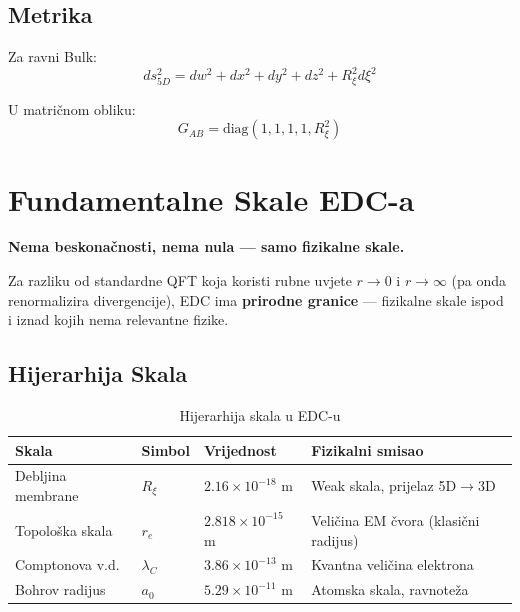 \documentclass[12pt,a4paper]{article}
\begin{document}
\subsection{Metrika}

Za ravni Bulk:
\begin{equation}
ds^2_{5D} = dw^2 + dx^2 + dy^2 + dz^2 + R_\xi^2 d\xi^2
\end{equation}

U matričnom obliku:
\begin{equation}
G_{AB} = \text{diag}(1, 1, 1, 1, R_\xi^2)
\end{equation}

\section{Fundamentalne Skale EDC-a}

\begin{edcprinciple}
\textbf{Nema beskonačnosti, nema nula — samo fizikalne skale.}

Za razliku od standardne QFT koja koristi rubne uvjete $r \to 0$ i $r \to \infty$ (pa onda renormalizira divergencije), EDC ima \textbf{prirodne granice} — fizikalne skale ispod i iznad kojih nema relevantne fizike.
\end{edcprinciple}

\subsection{Hijerarhija Skala}

\begin{table}[H]
\centering
\begin{tabular}{@{}llll@{}}
\toprule
\textbf{Skala} & \textbf{Simbol} & \textbf{Vrijednost} & \textbf{Fizikalni smisao} \\
\midrule
Debljina membrane & $R_\xi$ & $2.16 \times 10^{-18}$ m & Weak skala, prijelaz 5D$\to$3D \\
Topološka skala & $r_e$ & $2.818 \times 10^{-15}$ m & Veličina EM čvora (klasični radijus) \\
Comptonova v.d. & $\lambda_C$ & $3.86 \times 10^{-13}$ m & Kvantna veličina elektrona \\
Bohrov radijus & $a_0$ & $5.29 \times 10^{-11}$ m & Atomska skala, ravnoteža \\
\bottomrule
\end{tabular}
\caption{Hijerarhija skala u EDC-u}
\end{table}
\end{document}
